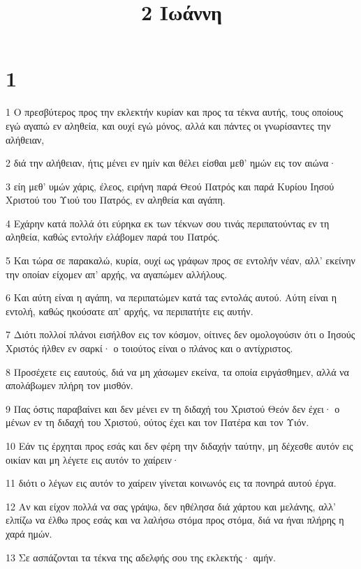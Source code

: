 

\title{2 Ιωάννη}


\chapter{1}

\par 1 Ο πρεσβύτερος προς την εκλεκτήν κυρίαν και προς τα τέκνα αυτής, τους οποίους εγώ αγαπώ εν αληθεία, και ουχί εγώ μόνος, αλλά και πάντες οι γνωρίσαντες την αλήθειαν,
\par 2 διά την αλήθειαν, ήτις μένει εν ημίν και θέλει είσθαι μεθ' ημών εις τον αιώνα·
\par 3 είη μεθ' υμών χάρις, έλεος, ειρήνη παρά Θεού Πατρός και παρά Κυρίου Ιησού Χριστού του Υιού του Πατρός, εν αληθεία και αγάπη.
\par 4 Εχάρην κατά πολλά ότι εύρηκα εκ των τέκνων σου τινάς περιπατούντας εν τη αληθεία, καθώς εντολήν ελάβομεν παρά του Πατρός.
\par 5 Και τώρα σε παρακαλώ, κυρία, ουχί ως γράφων προς σε εντολήν νέαν, αλλ' εκείνην την οποίαν είχομεν απ' αρχής, να αγαπώμεν αλλήλους.
\par 6 Και αύτη είναι η αγάπη, να περιπατώμεν κατά τας εντολάς αυτού. Αύτη είναι η εντολή, καθώς ηκούσατε απ' αρχής, να περιπατήτε εις αυτήν.
\par 7 Διότι πολλοί πλάνοι εισήλθον εις τον κόσμον, οίτινες δεν ομολογούσιν ότι ο Ιησούς Χριστός ήλθεν εν σαρκί· ο τοιούτος είναι ο πλάνος και ο αντίχριστος.
\par 8 Προσέχετε εις εαυτούς, διά να μη χάσωμεν εκείνα, τα οποία ειργάσθημεν, αλλά να απολάβωμεν πλήρη τον μισθόν.
\par 9 Πας όστις παραβαίνει και δεν μένει εν τη διδαχή του Χριστού Θεόν δεν έχει· ο μένων εν τη διδαχή του Χριστού, ούτος έχει και τον Πατέρα και τον Υιόν.
\par 10 Εάν τις έρχηται προς εσάς και δεν φέρη την διδαχήν ταύτην, μη δέχεσθε αυτόν εις οικίαν και μη λέγετε εις αυτόν το χαίρειν·
\par 11 διότι ο λέγων εις αυτόν το χαίρειν γίνεται κοινωνός εις τα πονηρά αυτού έργα.
\par 12 Αν και είχον πολλά να σας γράψω, δεν ηθέλησα διά χάρτου και μελάνης, αλλ' ελπίζω να έλθω προς εσάς και να λαλήσω στόμα προς στόμα, διά να ήναι πλήρης η χαρά ημών.
\par 13 Σε ασπάζονται τα τέκνα της αδελφής σου της εκλεκτής· αμήν.


